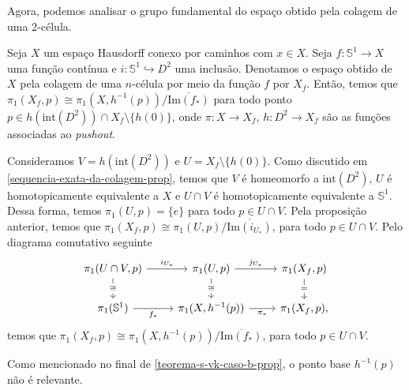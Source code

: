 Agora, podemos analisar o grupo fundamental do espaço obtido pela colagem de uma 2-célula.

\begin{corol}
    Seja $X$ um espaço Hausdorff conexo por caminhos com $x\in X$. Seja $f:\mathbb{S}^{1}\rightarrow X$ uma função contínua e $i:\mathbb{S}^{1}\hookrightarrow D^2$ uma inclusão. Denotamos o espaço obtido de $X$ pela colagem de uma $n$-célula por meio da função $f$ por $X_f$. Então, temos que $\pi_1(X_f, p)\cong \pi_1(X,h^{-1}(p))/\overline{\text{Im}(f_*)}$ para todo ponto $p\in h(\text{int}(D^2))\cap X_f\setminus\{h(0)\}$, onde $\pi:X\rightarrow X_f$, $h:D^2\rightarrow X_f$ são as funções associadas ao \emph{pushout}.
\end{corol}
\begin{dem}
     Consideramos $V=h(\text{int}(D^2))$ e $U=X_f\setminus \{h(0)\}$. Como discutido em \ref{sequencia-exata-da-colagem-prop}, temos que $V$ é homeomorfo a $\text{int}(D^2)$, $U$ é homotopicamente equivalente a $X$ e $U\cap V$ é homotopicamente equivalente a $\mathbb{S}^{1}$. Dessa forma, temos $\pi_1(U,p)=\{e\}$ para todo $p\in U\cap V$. Pela proposição anterior, temos que $\pi_1(X_f,p)\cong \pi_1(U, p)/\overline{\text{Im}(i_{U_*})}$, para todo $p\in U\cap V$. Pelo diagrama comutativo seguinte 
\[\begin{tikzcd}
	{\pi_1(U\cap V,p)} & {\pi_1(U,p)} & {\pi_1(X_f,p)} \\
	{\pi_1(\mathbb{S}^1)} & {\pi_1(X,h^{-1}(p))} & {\pi_1(X_f,p)},
	\arrow["{i_{U_*}}", from=1-1, to=1-2]
	\arrow["\cong"{description}, from=1-1, to=2-1]
	\arrow["{j_{U_*}}", from=1-2, to=1-3]
	\arrow["\cong"{description}, from=1-2, to=2-2]
	\arrow["{=}"{description}, from=1-3, to=2-3]
	\arrow["{f_*}"', from=2-1, to=2-2]
	\arrow["{\pi_*}"', from=2-2, to=2-3]
\end{tikzcd}\]
     temos que $\pi_1(X_f, p)\cong \pi_1(X,h^{-1}(p))/\overline{\text{Im}(f_*)}$, para todo $p\in U\cap V$.
\end{dem}

Como mencionado no final de \ref{teorema-s-vk-caso-b-prop}, o ponto base $h^{-1}(p)$ não é relevante.